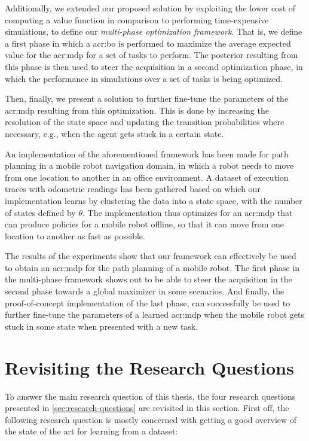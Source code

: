 Additionally, we extended our proposed solution by exploiting the lower cost of computing a value function in comparison to performing time-expensive simulations, to define our \textit{multi-phase optimization framework}.
That is, we define a first phase in which a \acrshort{acr:bo} is performed to maximize the average expected value for the \acrshort{acr:mdp} for a set of tasks to perform.
The posterior resulting from this phase is then used to steer the acquisition in a second optimization phase, in which the performance in simulations over a set of tasks is being optimized.

Then, finally, we present a solution to further fine-tune the parameters of the \acrshort{acr:mdp} resulting from this optimization.
This is done by increasing the resolution of the state space and updating the transition probabilities where necessary, e.g., when the agent gets stuck in a certain state.

An implementation of the aforementioned framework has been made for path planning in a mobile robot navigation domain, in which a robot needs to move from one location to another in an office environment.
A dataset of execution traces with odometric readings has been gathered based on which our implementation learns  by clustering the data into a state space, with the number of states defined by $\theta$.
The implementation thus optimizes for an \acrshort{acr:mdp} that can produce policies for a mobile robot offline, so that it can move from one location to another as fast as possible.

The results of the experiments show that our framework can effectively be used to obtain an \acrshort{acr:mdp} for the path planning of a mobile robot.
The first phase in the multi-phase framework shows out to be able to steer the acquisition in the second phase towards a global maximizer in some scenarios.
And finally, the proof-of-concept implementation of the last phase, can successfully be used to further fine-tune the parameters of a learned \acrshort{acr:mdp} when the mobile robot gets stuck in some state when presented with a new task.


\section{Revisiting the Research Questions}
\label{sec:revisiting-research-questions}

To answer the main research question of this thesis, the four research questions presented in \autoref{sec:research-questions} are revisited in this section.
First off, the following research question is mostly concerned with getting a good overview of the state of the art for learning  from a dataset:

